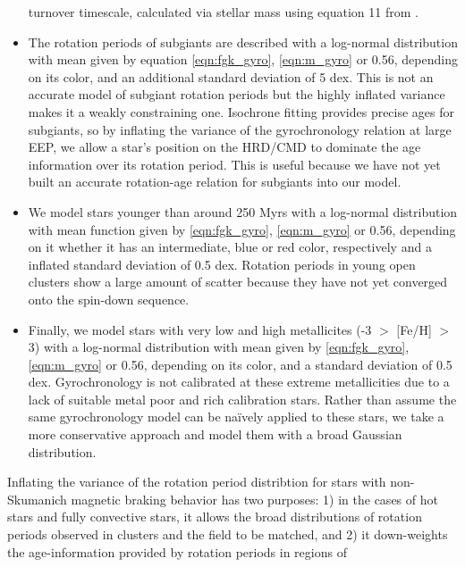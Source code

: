 \begin{itemize}
{        turnover timescale, calculated via stellar mass using equation 11 from
        \citet{wright2011}.}
    \item{The rotation periods of subgiants are described with a log-normal
        distribution with mean given by equation \ref{eqn:fgk_gyro},
        \ref{eqn:m_gyro} or 0.56, depending on its color, and an additional
        standard deviation of 5 dex.
        This is not an accurate model of subgiant rotation
        periods \citep[see, \eg][]{vansaders2013} but the highly
        inflated variance makes it a weakly constraining one.
        Isochrone fitting provides precise ages for subgiants, so by inflating
        the variance of the gyrochronology relation at large EEP, we allow a
        star's position on the HRD/CMD to dominate the age information over
        its rotation period.
        This is useful because we have not yet built an accurate rotation-age
        relation for subgiants into our model.}
    \item{We model stars younger than around 250 Myrs with a log-normal
        distribution with mean function given by \ref{eqn:fgk_gyro},
        \ref{eqn:m_gyro} or 0.56, depending on it whether it has
        an intermediate, blue or red color, respectively and a inflated
        standard deviation of 0.5 dex.
        Rotation periods in young open clusters show a large amount of scatter
        because they have not yet converged onto the \citet{skumanich1972}
        spin-down sequence.}
    \item{Finally, we model stars with very low and high metallicites (-3 $>$
        [Fe/H] $>$ 3) with a log-normal distribution with mean given by
        \ref{eqn:fgk_gyro}, \ref{eqn:m_gyro} or 0.56, depending on its color,
        and a standard deviation of 0.5 dex.
        Gyrochronology is not calibrated at these extreme metallicities due to
        a lack of suitable metal poor and rich calibration stars.
        Rather than assume the same gyrochronology model can be na\"ively
        applied to these stars, we take a more conservative approach and model
        them with a broad Gaussian distribution.}
\end{itemize}
Inflating the variance of the rotation period distribtion for stars with
non-Skumanich magnetic braking behavior has two purposes: 1) in the cases of
hot stars and fully convective stars, it allows the broad distributions of
rotation periods observed in clusters and the field to be matched, and 2) it
down-weights the age-information provided by rotation periods in regions of
